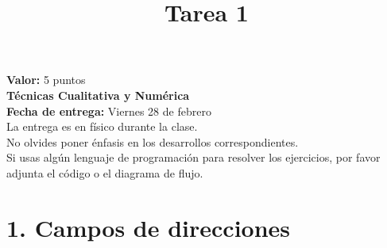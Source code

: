 \documentclass{article}
\title{Tarea 1}
\date{}
\begin{document}
\maketitle

\textbf{Valor:} 5 puntos \\
\textbf{Técnicas Cualitativa y Numérica} \\
\textbf{Fecha de entrega:} Viernes 28 de febrero \\
La entrega es en físico durante la clase. \\
No olvides poner énfasis en los desarrollos correspondientes. \\
Si usas algún lenguaje de programación para resolver los ejercicios, por favor adjunta el código o el diagrama de flujo.

\section*{1. Campos de direcciones}
\end{document}
